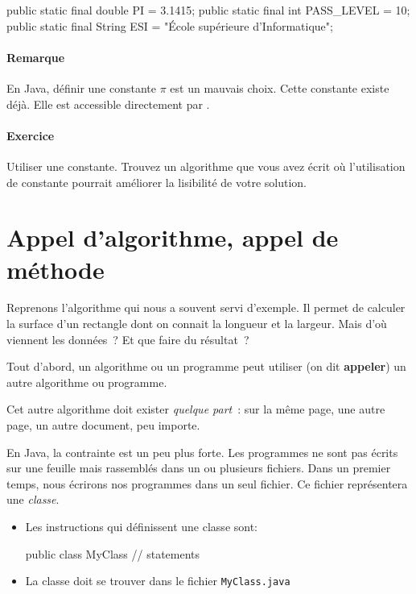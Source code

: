 			\begin{java}
public static final double PI = 3.1415;
public static final int PASS_LEVEL = 10;
public static final String ESI = "École supérieure d'Informatique";
			\end{java}

			\paragraph{Remarque}

			En Java, définir une constante $\pi$ est un mauvais choix. Cette 
			constante existe déjà. Elle est accessible directement 
			par .

		
			\begin{Emphase}
				\paragraph{Exercice}
				Utiliser une constante.
				Trouvez un algorithme que vous avez écrit
				où l’utilisation de constante
				pourrait améliorer la lisibilité de votre solution.
			\end{Emphase}
			
	\section{Appel d'algorithme, appel de méthode}
	
		Reprenons l’algorithme  qui nous a souvent servi
		d’exemple.  Il permet de calculer la surface d’un rectangle dont on
		connait la longueur et la largeur.  Mais d’où viennent les données~?  Et
		que faire du résultat~?
		
		Tout d’abord, un algorithme ou un programme peut utiliser 
		(on dit \textbf{appeler}) un autre algorithme ou programme.
	
		Cet autre algorithme doit exister \emph{quelque part}~: sur la même
		page, une autre page, un autre document, peu importe.
		
		En Java, la contrainte est un peu plus forte. Les programmes ne sont 
		pas écrits sur une feuille mais rassemblés dans un ou plusieurs fichiers.
		Dans un premier temps, nous écrirons nos programmes dans un seul fichier.
		Ce fichier représentera une \emph{classe}. 

		\begin{itemize}
			\item Les instructions qui définissent une classe sont:
				\begin{java}
public class MyClass{
	// statements
}
				\end{java}
			\item La classe  doit se trouver dans le fichier 
				\texttt{MyClass.java}
		\end{itemize}

